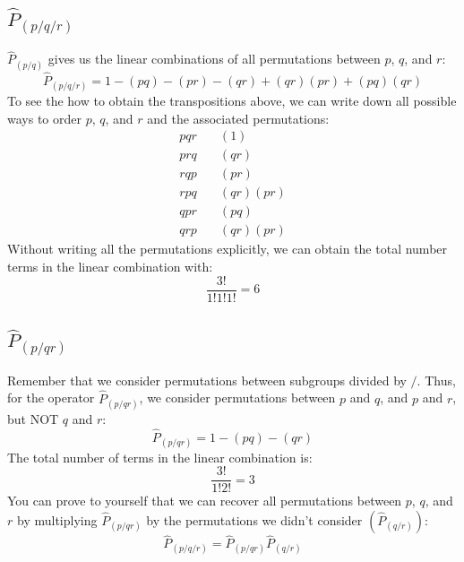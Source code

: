 \documentclass{article}
\begin{document}
\subsection{$\hat{P}_{(p/q/r)}$}
$\hat{P}_{(p/q)}$ gives us the linear combinations of all permutations between $p$, $q$, and $r$: 
 \[\hat{P}_{(p/q/r)} = 1 - (pq) - (pr) - (qr) + (qr)(pr) + (pq)(qr) \]
 To see the how to obtain the transpositions above, we can write down all possible ways to order $p$, $q$, and $r$ and the associated permutations: 
 \begin{align*}
pqr \quad& (1)  \\
 prq \quad& (qr) \\
rqp \quad& (pr)  \\
rpq \quad& (qr)(pr) \\
qpr \quad& (pq) \\
qrp  \quad& (qr)(pr)
 \end{align*}
 Without writing all the permutations explicitly, we can obtain the total number terms in the linear combination with:
 \[\frac{3!}{1! 1! 1!} = 6 \]
\subsection{$\hat{P}_{(p/qr)}$}
Remember that we consider permutations between subgroups divided by $/$. 
Thus, for the operator $\hat{P}_{(p/qr)}$, we consider permutations between $p$ and $q$, and $p$ and $r$, but NOT $q$ and $r$: 
 \[\hat{P}_{(p/qr)} = 1 - (pq) - (qr)  \]
 The total number of terms in the linear combination is: 
 \[\frac{3!}{1! 2!} = 3 \]
 You can prove to yourself that we can recover all permutations between $p$, $q$, and $r$ by multiplying  $\hat{P}_{(p/qr)}$ by the permutations we didn't consider $ \left( \hat{P}_{(q/r)}\right)$:
 \[ \hat{P}_{(p/q/r)} = \hat{P}_{(p/qr)}\hat{P}_{(q/r)}\]
\end{document}
